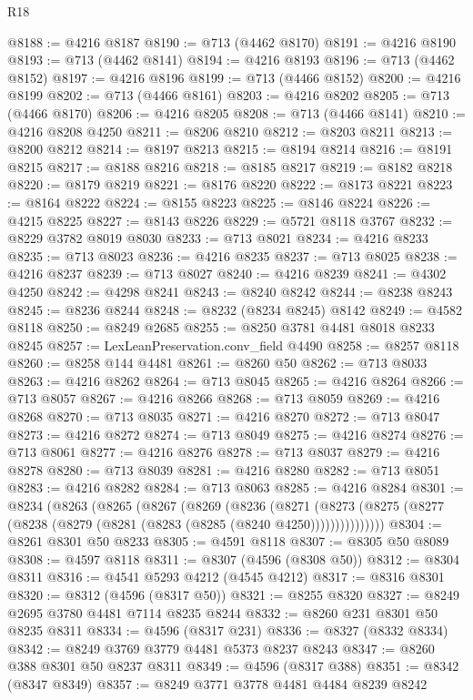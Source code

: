 \begin{lexlean}{R18}
\begin{coremodule}
@8188 := @4216 @8187
@8190 := @713 (@4462 @8170)
@8191 := @4216 @8190
@8193 := @713 (@4462 @8141)
@8194 := @4216 @8193
@8196 := @713 (@4462 @8152)
@8197 := @4216 @8196
@8199 := @713 (@4466 @8152)
@8200 := @4216 @8199
@8202 := @713 (@4466 @8161)
@8203 := @4216 @8202
@8205 := @713 (@4466 @8170)
@8206 := @4216 @8205
@8208 := @713 (@4466 @8141)
@8210 := @4216 @8208 @4250
@8211 := @8206 @8210
@8212 := @8203 @8211
@8213 := @8200 @8212
@8214 := @8197 @8213
@8215 := @8194 @8214
@8216 := @8191 @8215
@8217 := @8188 @8216
@8218 := @8185 @8217
@8219 := @8182 @8218
@8220 := @8179 @8219
@8221 := @8176 @8220
@8222 := @8173 @8221
@8223 := @8164 @8222
@8224 := @8155 @8223
@8225 := @8146 @8224
@8226 := @4215 @8225
@8227 := @8143 @8226
@8229 := @5721 @8118 @3767
@8232 := @8229 @3782 @8019 @8030
@8233 := @713 @8021
@8234 := @4216 @8233
@8235 := @713 @8023
@8236 := @4216 @8235
@8237 := @713 @8025
@8238 := @4216 @8237
@8239 := @713 @8027
@8240 := @4216 @8239
@8241 := @4302 @4250
@8242 := @4298 @8241
@8243 := @8240 @8242
@8244 := @8238 @8243
@8245 := @8236 @8244
@8248 := @8232 (@8234 @8245) @8142
@8249 := @4582 @8118
@8250 := @8249 @2685
@8255 := @8250 @3781 @4481 @8018 @8233 @8245
@8257 := LexLeanPreservation.conv_field @4490
@8258 := @8257 @8118
@8260 := @8258 @144 @4481
@8261 := @8260 @50
@8262 := @713 @8033
@8263 := @4216 @8262
@8264 := @713 @8045
@8265 := @4216 @8264
@8266 := @713 @8057
@8267 := @4216 @8266
@8268 := @713 @8059
@8269 := @4216 @8268
@8270 := @713 @8035
@8271 := @4216 @8270
@8272 := @713 @8047
@8273 := @4216 @8272
@8274 := @713 @8049
@8275 := @4216 @8274
@8276 := @713 @8061
@8277 := @4216 @8276
@8278 := @713 @8037
@8279 := @4216 @8278
@8280 := @713 @8039
@8281 := @4216 @8280
@8282 := @713 @8051
@8283 := @4216 @8282
@8284 := @713 @8063
@8285 := @4216 @8284
@8301 := @8234
    (@8263
      (@8265
        (@8267
          (@8269
            (@8236
              (@8271
                (@8273 (@8275 (@8277 (@8238 (@8279 (@8281 (@8283 (@8285 (@8240 @4250)))))))))))))))
@8304 := @8261 @8301 @50 @8233
@8305 := @4591 @8118
@8307 := @8305 @50 @8089
@8308 := @4597 @8118
@8311 := @8307 (@4596 (@8308 @50))
@8312 := @8304 @8311
@8316 := @4541 @5293 @4212 (@4545 @4212)
@8317 := @8316 @8301
@8320 := @8312 (@4596 (@8317 @50))
@8321 := @8255 @8320
@8327 := @8249 @2695 @3780 @4481 @7114 @8235 @8244
@8332 := @8260 @231 @8301 @50 @8235 @8311
@8334 := @4596 (@8317 @231)
@8336 := @8327 (@8332 @8334)
@8342 := @8249 @3769 @3779 @4481 @5373 @8237 @8243
@8347 := @8260 @388 @8301 @50 @8237 @8311
@8349 := @4596 (@8317 @388)
@8351 := @8342 (@8347 @8349)
@8357 := @8249 @3771 @3778 @4481 @4484 @8239 @8242

\end{coremodule}
\end{lexlean}
